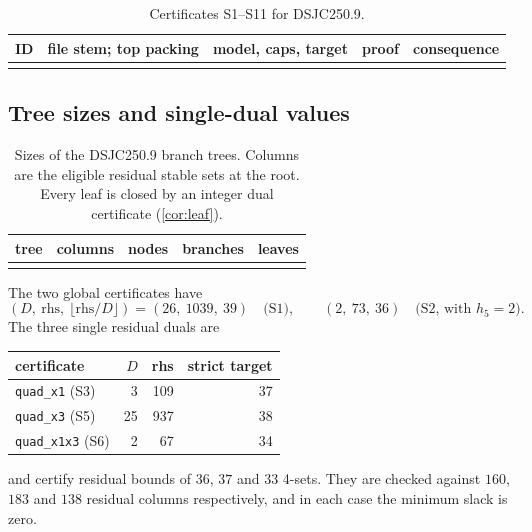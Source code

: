 \documentclass[11pt]{article}
\theoremstyle{definition}
\newcommand{\DSJCTwoFifty}{\textnormal{\textsc{DSJC250.9}}}
\begin{document}
\begin{table}[htbp]
\centering
\scriptsize
\setlength{\tabcolsep}{3pt}
\renewcommand{\arraystretch}{1.14}
\caption{Certificates S1--S11 for \DSJCTwoFifty{}.}
\label{tab:certificate-obligations}
\begin{tabularx}{\textwidth}{@{}ll>{\raggedright\arraybackslash}Xl>{\raggedright\arraybackslash}X@{}}
\toprule
ID & file stem; top packing & model, caps, target & proof & consequence\\
\midrule
\tabularnewline
\bottomrule
\end{tabularx}
\end{table}

\subsection{Tree sizes and single-dual values}

\begin{table}[ht]
\centering
\caption{Sizes of the \DSJCTwoFifty{} branch trees. Columns are the eligible
residual stable sets at the root. Every leaf is closed by an integer dual
certificate (\cref{cor:leaf}).}
\label{tab:tree-stats}
\begin{tabular}{@{}lrrrr@{}}
\toprule
tree & columns & nodes & branches & leaves\\
\midrule
\tabularnewline
\bottomrule
\end{tabular}
\end{table}

The two global certificates have
\[
  (D,\ \mathrm{rhs},\ \lfloor\mathrm{rhs}/D\rfloor)=(26,\ 1039,\ 39)
  \quad\text{(S1)},\qquad (2,\ 73,\ 36)\quad\text{(S2, with $h_5=2$)}.
\]
The three single residual duals are
\begin{center}
\begin{tabular}{@{}lrrr@{}}
\toprule
certificate & $D$ & rhs & strict target\\
\midrule
\texttt{quad\_x1} (S3) & 3 & 109 & 37\\
\texttt{quad\_x3} (S5) & 25 & 937 & 38\\
\texttt{quad\_x1x3} (S6) & 2 & 67 & 34\\
\bottomrule
\end{tabular}
\end{center}
and certify residual bounds of $36$, $37$ and $33$ 4-sets. They are checked
against $160$, $183$ and $138$ residual columns respectively, and in each
case the minimum slack is zero.
\end{document}
